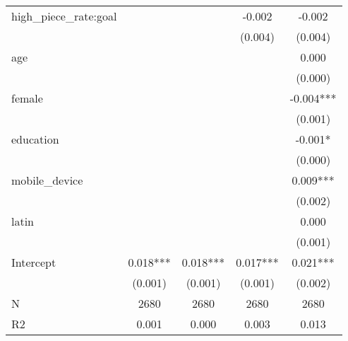 \begin{table}
\begin{center}
\begin{tabular}{lcccc}
high\_piece\_rate:goal         &                    &                     & -0.002               & -0.002                 \\
                               &                    &                     & (0.004)              & (0.004)                \\
age                            &                    &                     &                      & 0.000                  \\
                               &                    &                     &                      & (0.000)                \\
female                         &                    &                     &                      & -0.004***              \\
                               &                    &                     &                      & (0.001)                \\
education                      &                    &                     &                      & -0.001*                \\
                               &                    &                     &                      & (0.000)                \\
mobile\_device                 &                    &                     &                      & 0.009***               \\
                               &                    &                     &                      & (0.002)                \\
latin                          &                    &                     &                      & 0.000                  \\
                               &                    &                     &                      & (0.001)                \\
Intercept                      & 0.018***           & 0.018***            & 0.017***             & 0.021***               \\
                               & (0.001)            & (0.001)             & (0.001)              & (0.002)                \\
N                              & 2680               & 2680                & 2680                 & 2680                   \\
R2                             & 0.001              & 0.000               & 0.003                & 0.013                  \\
\hline
\end{tabular}
\end{center}
\end{table}